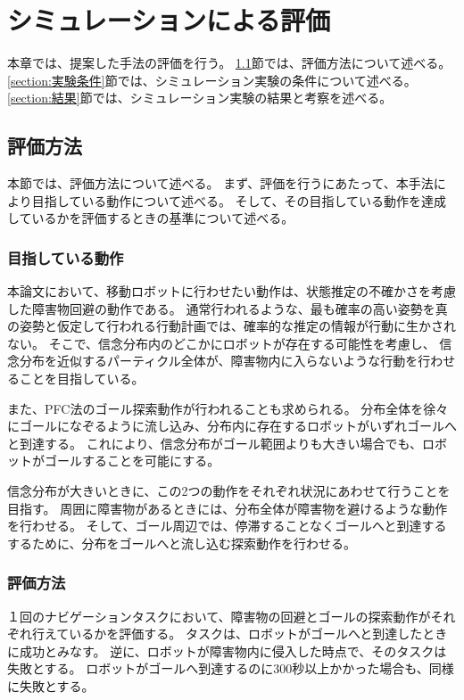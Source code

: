 \chapter{シミュレーションによる評価} \label{chapter:evaluate}
本章では、提案した手法の評価を行う。
\ref{section:評価方法}節では、評価方法について述べる。
\ref{section:実験条件}節では、シミュレーション実験の条件について述べる。
\ref{section:結果}節では、シミュレーション実験の結果と考察を述べる。

\section{評価方法} \label{section:評価方法}
本節では、評価方法について述べる。
まず、評価を行うにあたって、本手法により目指している動作について述べる。
そして、その目指している動作を達成しているかを評価するときの基準について述べる。

\subsection{目指している動作}
本論文において、移動ロボットに行わせたい動作は、状態推定の不確かさを考慮した障害物回避の動作である。
通常行われるような、最も確率の高い姿勢を真の姿勢と仮定して行われる行動計画では、確率的な推定の情報が行動に生かされない。
そこで、信念分布内のどこかにロボットが存在する可能性を考慮し、
信念分布を近似するパーティクル全体が、障害物内に入らないような行動を行わせることを目指している。

また、PFC法のゴール探索動作が行われることも求められる。
分布全体を徐々にゴールになぞるように流し込み、分布内に存在するロボットがいずれゴールへと到達する。
これにより、信念分布がゴール範囲よりも大きい場合でも、ロボットがゴールすることを可能にする。

信念分布が大きいときに、この2つの動作をそれぞれ状況にあわせて行うことを目指す。
周囲に障害物があるときには、分布全体が障害物を避けるような動作を行わせる。
そして、ゴール周辺では、停滞することなくゴールへと到達するするために、分布をゴールへと流し込む探索動作を行わせる。

\subsection{評価方法}
１回のナビゲーションタスクにおいて、障害物の回避とゴールの探索動作がそれぞれ行えているかを評価する。
タスクは、ロボットがゴールへと到達したときに成功とみなす。
逆に、ロボットが障害物内に侵入した時点で、そのタスクは失敗とする。
ロボットがゴールへ到達するのに300秒以上かかった場合も、同様に失敗とする。

